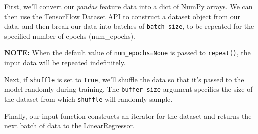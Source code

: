 \documentclass[11pt]{article}
\begin{document}
First, we'll convert our \emph{pandas} feature data into a dict of NumPy
arrays. We can then use the TensorFlow
\href{https://www.tensorflow.org/programmers_guide/datasets}{Dataset
API} to construct a dataset object from our data, and then break our
data into batches of \texttt{batch\_size}, to be repeated for the
specified number of epochs (num\_epochs).

\textbf{NOTE:} When the default value of \texttt{num\_epochs=None} is
passed to \texttt{repeat()}, the input data will be repeated
indefinitely.

Next, if \texttt{shuffle} is set to \texttt{True}, we'll shuffle the
data so that it's passed to the model randomly during training. The
\texttt{buffer\_size} argument specifies the size of the dataset from
which \texttt{shuffle} will randomly sample.

Finally, our input function constructs an iterator for the dataset and
returns the next batch of data to the LinearRegressor.
\end{document}
